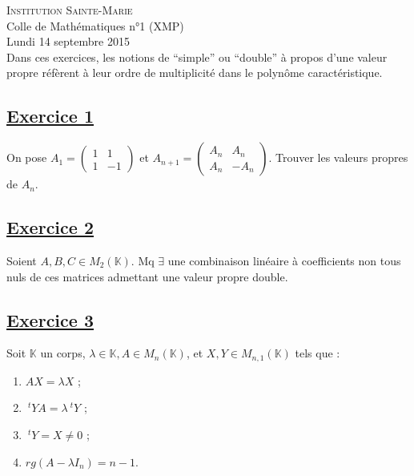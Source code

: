 \documentclass[12pt,a4paper]{report}
\begin{document}
\newcommand{\rA}{\mathcal{A}}
\newcommand{\rB}{\mathcal{B}}
\newcommand{\rC}{\mathcal{C}}
\newcommand{\rG}{\mathcal{G}}
\newcommand{\rF}{\mathcal{F}}
\newcommand{\rP}{\mathcal{P}}
\newcommand{\rH}{\mathcal{H}}
\newcommand{\rR}{\mathcal{R}}
\newcommand{\rE}{\mathcal{E}}
\newcommand{\rL}{\mathcal{L}}
\newcommand{\rM}{\mathcal{M}}
\newcommand{\bK}{\mathbb{K}}
\newcommand{\bQ}{\mathbb{Q}}
\newcommand{\bR}{\mathbb{R}}
\newcommand{\bZ}{\mathbb{Z}}
\newcommand{\bN}{\mathbb{N}}
\newcommand{\bC}{\mathbb{C}}
\newcommand{\bP}{\mathbb{P}}
\newcommand{\bF}{\mathbb{F}}

\ifpdf
{}
\else
{}
\fi

\pagestyle{empty} %

\noindent \textsc{Institution Sainte-Marie}\\
Colle de Mathématiques n°1 (XMP)\\
Lundi 14 septembre 2015\\

Dans ces exercices, les notions de ``simple'' ou ``double'' à propos d'une valeur propre réfèrent à leur ordre de multiplicité dans le polynôme caractéristique.


\subsection*{\underline{Exercice 1}} %
On pose $A_1= \begin{pmatrix} 1 & 1 \\ 1 & -1 \end{pmatrix}$ et $A_{n+1}=\begin{pmatrix} A_n & A_n \\ A_n & -A_n \end{pmatrix}$. Trouver les valeurs propres de $A_n$.

\subsection*{\underline{Exercice 2}} %
Soient $A,B,C \in M_2(\bK)$. Mq $\exists$ une combinaison linéaire à coefficients non tous nuls de ces matrices admettant une valeur propre double.

\subsection*{\underline{Exercice 3}} %
Soit $\bK$ un corps, $\lambda\in\bK, A\in M_n(\bK)$, et $X,Y\in M_{n,1}(\bK)$ tels que :
\begin{enumerate}
\item $AX=\lambda X$ ;
\item $~^tYA = \lambda ~^tY$ ;
\item $~^tY=X \neq 0$ ;
\item $rg(A-\lambda I_n)=n-1$.
\end{enumerate}
\end{document}
